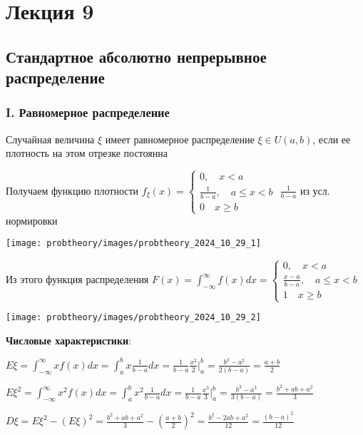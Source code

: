 \documentclass[12pt]{article}
\begin{document}

    \section{Лекция 9}

    \subsection{Стандартное абсолютно непрерывное распределение}

    \hypertarget{uniformdistribution}{}

    \subsubsection{I. Равномерное распределение}

    \Defs Случайная величина $\xi$ имеет равномерное распределение $\xi \in U(a, b)$, если ее плотность
    на этом отрезке постоянна

    Получаем функцию плотности $f_\xi(x) = \begin{cases}0, \quad x < a \\ \frac{1}{b - a}, \quad a \leq x < b \\ 0 \quad x \geq b\end{cases}$ \hfill {\scriptsize $\frac{1}{b - a}$ из усл. нормировки}

    \texttt{[image: probtheory/images/probtheory\_2024\_10\_29\_1]}

    Из этого функция распределения $F(x) = \int_{-\infty}^\infty f(x)dx = \begin{cases}0, \quad x < a \\ \frac{x - a}{b - a}, \quad a \leq x < b \\ 1 \quad x \geq b\end{cases}$

    \texttt{[image: probtheory/images/probtheory\_2024\_10\_29\_2]}

    \textbf{Числовые характеристики}:

    $E\xi = \int_{-\infty}^\infty x f(x) dx = \int_a^b x \frac{1}{b - a} dx = \frac{1}{b - a} \frac{x^2}{2} \Big|_a^b = \frac{b^2 - a^2}{2(b - a)} = \frac{a + b}{2}$

    $E\xi^2 = \int_{-\infty}^\infty x^2 f(x) dx = \int_a^b x^2 \frac{1}{b - a} dx = \frac{1}{b - a} \frac{x^3}{3} \Big|_a^b = \frac{b^3 - a^3}{3(b - a)} = \frac{b^2 + ab + a^2}{3}$

    $D\xi = E\xi^2 - (E\xi)^2 = \frac{b^2 + ab + a^2}{3} - \left(\frac{a + b}{2}\right)^2 = \frac{b^2 - 2ab + a^2}{12} = \frac{(b - a)^2}{12}$
    
\end{document}
